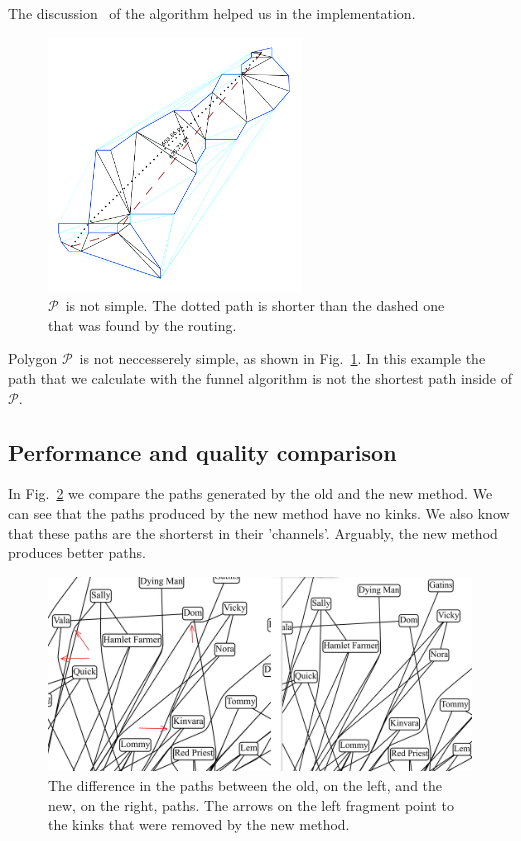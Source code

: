 \documentclass{gd-llncs}
\newcommand{\plg}{$\mathcal{P}$}
\begin{document}
{The discussion~\cite{pathOpt} of the algorithm helped us in the implementation.\\
\begin{figure}[]
  \centering
  \includegraphics*[width=0.6\textwidth]{sleeve_diagonals_not_optimal.pdf}
  \caption{\plg~is not simple. The dotted path is shorter than the dashed one that was found by the routing.}
  \label{fig:non_optimal_path}
\end{figure}
Polygon \plg~is not neccesserely simple, as shown in Fig.~\ref{fig:non_optimal_path}.
In this example the path that we calculate with the funnel algorithm is not the shortest path inside of \plg.
\subsection*{Performance and quality comparison}
In Fig.~\ref{fig:improved_routing} we compare the paths generated by the old and the new method. We can see that the paths produced by the new method have no kinks. We also know that these paths are  the shorterst in their 'channels'. Arguably, the new method produces better paths.
\begin{figure}[]
  \centering
  \includegraphics*[width=1\textwidth]{comparison.png}
  \caption{The difference in the paths between the old, on the left, and the new, on the right, paths. The arrows on the left fragment point to the kinks that were removed by the new method.}
  \label{fig:improved_routing}
\end{figure}

}
\end{document}
